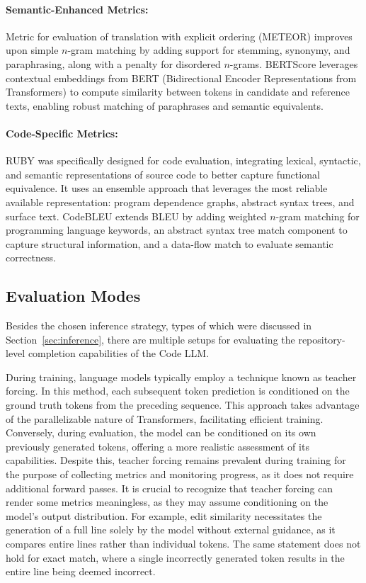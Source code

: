 \paragraph{Semantic-Enhanced Metrics:} Metric for evaluation of translation with explicit ordering (METEOR) \parencite{banarjee2005} improves upon simple \(n\)-gram matching by adding support for stemming, synonymy, and paraphrasing, along with a penalty for disordered \(n\)-grams. BERTScore \parencite{zhang2019} leverages contextual embeddings from BERT (Bidirectional Encoder Representations from Transformers) to compute similarity between tokens in candidate and reference texts, enabling robust matching of paraphrases and semantic equivalents.

\paragraph{Code-Specific Metrics:} RUBY \parencite{tran2019} was specifically designed for code evaluation, integrating lexical, syntactic, and semantic representations of source code to better capture functional equivalence. It uses an ensemble approach that leverages the most reliable available representation: program dependence graphs, abstract syntax trees, and surface text. CodeBLEU \parencite{ren2020} extends BLEU by adding weighted \(n\)-gram matching for programming language keywords, an abstract syntax tree match component to capture structural information, and a data-flow match to evaluate semantic correctness.

\subsection{Evaluation Modes}

Besides the chosen inference strategy, types of which were discussed in Section~\ref{sec:inference}, there are multiple setups for evaluating the repository-level completion capabilities of the Code LLM.

During training, language models typically employ a technique known as teacher forcing. In this method, each subsequent token prediction is conditioned on the ground truth tokens from the preceding sequence. This approach takes advantage of the parallelizable nature of Transformers, facilitating efficient training. Conversely, during evaluation, the model can be conditioned on its own previously generated tokens, offering a more realistic assessment of its capabilities. Despite this, teacher forcing remains prevalent during training for the purpose of collecting metrics and monitoring progress, as it does not require additional forward passes. It is crucial to recognize that teacher forcing can render some metrics meaningless, as they may assume conditioning on the model's output distribution. For example, edit similarity necessitates the generation of a full line solely by the model without external guidance, as it compares entire lines rather than individual tokens. The same statement does not hold for exact match, where a single incorrectly generated token results in the entire line being deemed incorrect.


